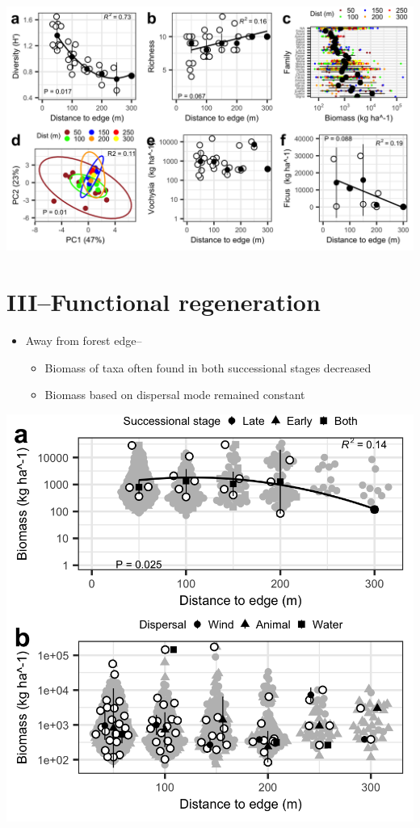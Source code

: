 \documentclass[
]{article}
\begin{document}
\includegraphics{../figs/fig2.png}

\hypertarget{iiifunctional-regeneration}{%
\section{III--Functional
regeneration}\label{iiifunctional-regeneration}}

\begin{itemize}
\item
  Away from forest edge--

  \begin{itemize}
  \item
    Biomass of taxa often found in both successional stages decreased
  \item
    Biomass based on dispersal mode remained constant
  \end{itemize}
\end{itemize}

\includegraphics{../figs/fig3.png}
\end{document}
